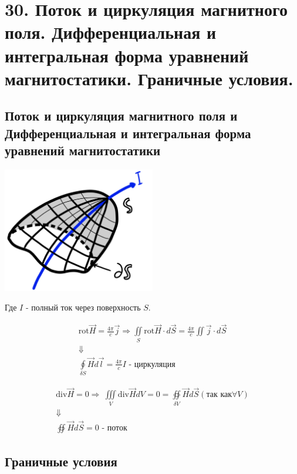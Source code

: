 \section*{30. Поток и циркуляция магнитного поля. Дифференциальная и интегральная
форма уравнений магнитостатики. Граничные условия.}

\subsection*{Поток и циркуляция магнитного поля и Дифференциальная и интегральная
форма уравнений магнитостатики}

\begin{center}
    \includegraphics[width=0.5\textwidth]{im/66.png}
\end{center}

Где $I$ - полный ток через поверхность $S$. 
 
\begin{gather*}
    \mathrm{rot}\vec{H}=\frac{4\pi}{c}\vec{j}\Rightarrow \underset{S}{\iint}\mathrm{rot}\vec{H}\cdot d\vec{S}=\frac{4\pi}{c}\iint \vec{j}\cdot d\vec{S}  \\
    \Downarrow \\
    \boxed{\underset{\delta S}{\oint}\vec{H}d\vec{l}=\frac{4\pi}{c}I }\textit{ - циркуляция}
\end{gather*}

\begin{gather*}
    \mathrm{div}\vec{H}=0\Rightarrow \ \underset{V}{\iiint}\mathrm{div}\vec{H}dV=0=\underset{\delta V}{\oiint}\vec{H}d\vec{S}(\text{так как}\forall V) \\
    \Downarrow \\
    \boxed{\oiint \vec{H}d\vec{S}=0}\textit{ - поток}
\end{gather*}

\newpage

\subsection*{Граничные условия}

